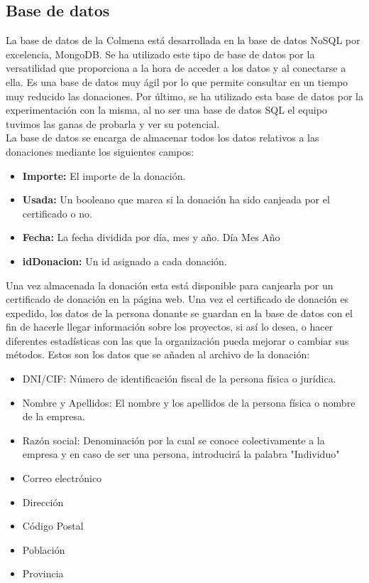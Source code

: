 \subsection{Base de datos}

La base de datos de la Colmena está desarrollada en la base de datos NoSQL por excelencia, MongoDB. Se ha utilizado este tipo de base de datos por la versatilidad que proporciona a la hora de acceder a los datos y al conectarse a ella. Es una base de datos muy ágil por lo que permite consultar en un tiempo muy reducido las donaciones. Por último, se ha utilizado esta base de datos por la experimentación con la misma, al no ser una base de datos SQL el equipo tuvimos las ganas de probarla y ver su potencial.\\

La base de datos se encarga de almacenar todos los datos relativos a las donaciones mediante los siguientes campos:

\begin{itemize}
	\item \textbf{Importe:} El importe de la donación.
	\item \textbf{Usada:} Un booleano que marca si la donación ha sido canjeada por el certificado o no.
	\item \textbf{Fecha:} La fecha dividida por día, mes y año.
	\subitem Día
	\subitem Mes
	\subitem Año
	\item \textbf{idDonacion:} Un id asignado a cada donación.\\
\end{itemize}

Una vez almacenada la donación esta está disponible para canjearla por un certificado de donación en la página web. Una vez el certificado de donación es expedido, los datos de la persona donante se guardan en la base de datos con el fin de hacerle llegar información sobre los proyectos, si así lo desea, o hacer diferentes estadísticas con las que la organización pueda mejorar o cambiar sus métodos. Estos son los datos que se añaden al archivo de la donación:

\begin{itemize}
	\item DNI/CIF: Número de identificación fiscal de la persona física o jurídica.
	\item Nombre y Apellidos: El nombre y los apellidos de la persona física o nombre de la empresa.
	\item Razón social: Denominación por la cual se conoce colectivamente a la empresa y en caso de ser una persona, introducirá la palabra "Individuo"
	\item Correo electrónico
	\item Dirección
	\item Código Postal
	\item Población
	\item Provincia
\end{itemize}


